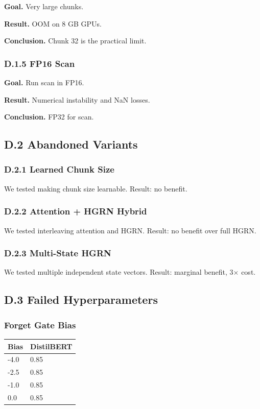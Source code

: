 \textbf{Goal.} Very large chunks.

\textbf{Result.} OOM on 8 GB GPUs.

\textbf{Conclusion.} Chunk 32 is the practical limit.

\subsubsection{D.1.5 FP16 Scan}

\textbf{Goal.} Run scan in FP16.

\textbf{Result.} Numerical instability and NaN losses.

\textbf{Conclusion.} FP32 for scan.

\subsection{D.2 Abandoned Variants}

\subsubsection{D.2.1 Learned Chunk Size}

We tested making chunk size learnable. Result: no benefit.

\subsubsection{D.2.2 Attention + HGRN Hybrid}

We tested interleaving attention and HGRN. Result: no benefit over full HGRN.

\subsubsection{D.2.3 Multi-State HGRN}

We tested multiple independent state vectors. Result: marginal benefit, 3$\times$ cost.

\subsection{D.3 Failed Hyperparameters}

\subsubsection{Forget Gate Bias}

\begin{table}[H]
\centering
\small
\begin{tabular}{ll}
\toprule
\textbf{Bias} & \textbf{DistilBERT} \\
\midrule
-4.0 & 0.85 \\
-2.5 & 0.85 \\
-1.0 & 0.85 \\
0.0 & 0.85 \\
\bottomrule
\end{tabular}
\end{table}

